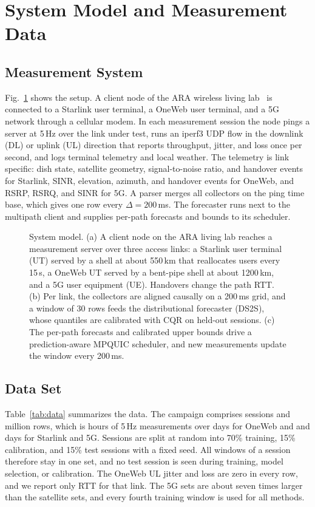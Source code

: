 \section{System Model and Measurement Data}
\label{sec:system}
\subsection{Measurement System}
Fig.~\ref{fig:system} shows the setup. A client node of the ARA wireless living lab~\cite{islam2025design} is connected to a Starlink user terminal, a OneWeb user terminal, and a 5G network through a cellular modem. In each measurement session the node pings a server at 5\,Hz over the link under test, runs an iperf3 UDP flow in the downlink (DL) or uplink (UL) direction that reports throughput, jitter, and loss once per second, and logs terminal telemetry and local weather. The telemetry is link specific: dish state, satellite geometry, signal-to-noise ratio, and handover events for Starlink, SINR, elevation, azimuth, and handover events for OneWeb, and RSRP, RSRQ, and SINR for 5G. A parser merges all collectors on the ping time base, which gives one row every $\Delta=200$\,ms. The forecaster runs next to the multipath client and supplies per-path forecasts and bounds to its scheduler.

\begin{figure}[t]
  \centering
  \resizebox{\textwidth}{!}{}
  \caption{System model. (a) A client node on the ARA living lab reaches a measurement server over three access links: a Starlink user terminal (UT) served by a shell at about 550\,km that reallocates users every 15\,s, a OneWeb UT served by a bent-pipe shell at about 1200\,km, and a 5G user equipment (UE). Handovers change the path RTT. (b) Per link, the collectors are aligned causally on a 200\,ms grid, and a window of 30 rows feeds the distributional forecaster (DS2S), whose quantiles are calibrated with CQR on held-out sessions. (c) The per-path forecasts and calibrated upper bounds drive a prediction-aware MPQUIC scheduler, and new measurements update the window every 200\,ms.}
  \label{fig:system}
\end{figure}

\subsection{Data Set}
Table~\ref{tab:data} summarizes the data. The campaign comprises \DataSessions{} sessions and \DataRows{} million rows, which is \DataHours{} hours of 5\,Hz measurements over \DataDaysOW{} days for OneWeb and \DataDaysSL{} and \DataDaysQ{} days for Starlink and 5G. Sessions are split at random into 70\% training, 15\% calibration, and 15\% test sessions with a fixed seed. All windows of a session therefore stay in one set, and no test session is seen during training, model selection, or calibration. The OneWeb UL jitter and loss are zero in every row, and we report only RTT for that link. The 5G sets are about seven times larger than the satellite sets, and every fourth training window is used for all methods.

